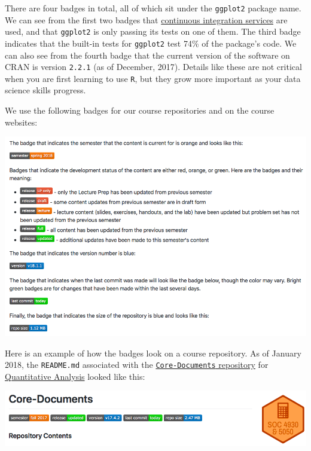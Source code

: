 \documentclass[]{book}
\theoremstyle{definition}
\theoremstyle{definition}
\theoremstyle{definition}
\theoremstyle{remark}
\begin{document}
There are four badges in total, all of which sit under the
\texttt{ggplot2} package name. We can see from the first two badges that
\href{https://en.wikipedia.org/wiki/Continuous_integration}{continuous
integration services} are used, and that \texttt{ggplot2} is only
passing its tests on one of them. The third badge indicates that the
built-in tests for \texttt{ggplot2} test 74\% of the package's code. We
can also see from the fourth badge that the current version of the
software on CRAN is version \texttt{2.2.1} (as of December, 2017).
Details like these are not critical when you are first learning to use
\texttt{R}, but they grow more important as your data science skills
progress.

We use the following badges for our course repositories and on the
course websites:

\begin{center}\includegraphics[width=0.95\linewidth]{images/readmeBadges} \end{center}

Here is an example of how the badges look on a course repository. As of
January 2018, the \texttt{README.md} associated with the
\href{https://github.com/slu-soc5050/Core-Documents}{\texttt{Core-Documents}
repository} for \href{https://slu-soc5050.github.io}{Quantitative
Analysis} looked like this:

\begin{center}\includegraphics[width=0.95\linewidth]{images/readmeBadgesEx} \end{center}
\end{document}
